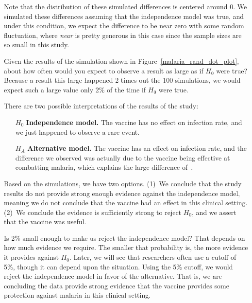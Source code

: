 Note that the distribution of these simulated differences
is centered around 0.
We simulated these differences assuming that the independence
model was true, and under this condition,
we expect the difference to be near zero with some random
fluctuation, where \emph{near} is pretty generous in this
case since the sample sizes are so small in this study.

\begin{examplewrap}
\begin{nexample}{Given the results of the simulation shown in Figure~\ref{malaria_rand_dot_plot}, about how often would you expect to observe a result as large as \malariaIRDiffPerc{} if $H_0$ were true?} 
  Because a result this large happened 2 times out the 100 simulations, we would expect such a large value only 2\% of the time if $H_0$ were true.  
\end{nexample}
\end{examplewrap}

There are two possible interpretations
of the results of the study:
\begin{itemize}
  \setlength{\itemsep}{0mm}
  \item[$H_0$] \textbf{Independence model.}
      The vaccine has no effect on infection rate,
      and we just happened to observe a rare event.
  \item[$H_A$] \textbf{Alternative model.}
      The vaccine has an effect on infection rate,
      and the difference we observed was actually due to
      the vaccine being effective at combatting malaria,
      which explains the large difference
      of~\malariaIRDiffPerc{}.
\end{itemize}
Based on the simulations, we have two options.
(1)~We conclude that the study results do not provide
strong enough evidence against the independence model,
meaning we do not conclude that the vaccine had an effect
in this clinical setting.
(2)~We conclude the evidence is sufficiently strong
to reject $H_0$, and we assert that the vaccine was useful.

Is 2\% small enough to make us reject the independence model?  That depends on how much evidence we require.  The smaller that probability is, the more evidence it provides against $H_0$.  Later, we will see that researchers often use a cutoff of 5\%, though it can depend upon the situation.
Using the 5\% cutoff, we would reject the independence model in favor
of the alternative.
That is, we are concluding the data provide strong evidence
that the vaccine provides some protection against malaria
in this clinical setting. 

